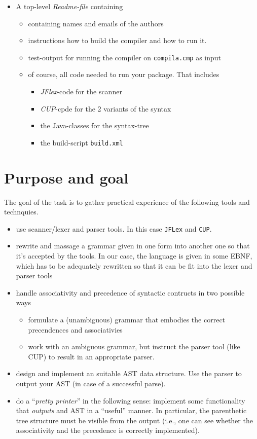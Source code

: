 \documentclass[11pt,freeform]{handout}[2014/08/13]
\begin{document}
\begin{itemize}
\item A top-level \emph{Readme-file} containing
  \begin{itemize}
  \item  containing names and emails of the authors
  \item instructions how to build the compiler and how to run it.
  \item test-output for running the compiler on \texttt{compila.cmp} as
    input
  \item of course, all code needed to run your package. That includes
    \begin{itemize}
    \item \textsl{JFlex}-code for the scanner
    \item \textsl{CUP}-cpde for the 2 variants of the syntax
    \item the Java-classes for the syntax-tree
    \item the build-script \texttt{build.xml}
    \end{itemize}
  \end{itemize}


\end{itemize}



\section{Purpose and goal}
\label{sec:x}

The goal of the task is to gather practical experience of the following
tools and technquies.
\begin{itemize}
\item use scanner/lexer and parser tools. In this case \texttt{JFLex} and \texttt{CUP}.
\item rewrite and massage a grammar given in one form into another one so
  that it's accepted by the tools. In our case, the language is given in
  some EBNF, which has to be adequately rewritten so that it can be fit
  into the lexer and parser tools
\item handle associativity and precedence of syntactic contructs in two
  possible ways
  \begin{itemize}
  \item formulate a (unambiguous) grammar that embodies the correct
    precendences and associativies
  \item work with an ambiguous grammar, but instruct the parser tool (like
    CUP) to result in an appropriate parser.
  \end{itemize}
\item design and implement an suitable AST data structure.  Use the parser
  to output your AST (in case of a successful parse).
\item do a ``\emph{pretty printer}'' in the following sense: implement some
  functionality that \emph{outputs} and AST in a ``useful'' manner. In
  particular, the parenthetic tree structure must be visible from the
  output (i.e., one can see whether the associativity and the precedence is
  correctly implemented). 
\end{itemize}
\end{document}
